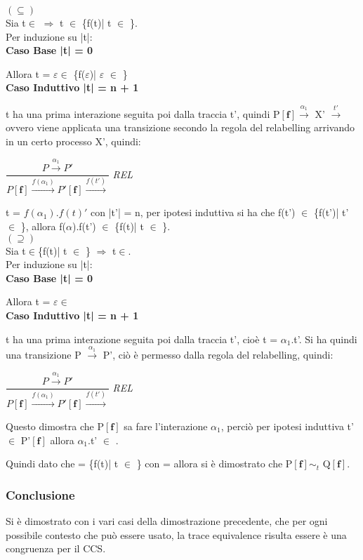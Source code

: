 $(\subseteq)$ \\

Sia t$\in$  $\Rightarrow$ t $\in$ \{f(t)| t $\in$ \}. \\
Per induzione su |t|:
\\

\textbf{Caso Base |t| = 0}

Allora t = $\varepsilon \in$ \{f($\varepsilon$)| $\varepsilon$ $\in$ \}\\


\textbf{Caso Induttivo |t| = n + 1}

t ha una prima interazione seguita poi dalla traccia t', quindi P$\mathbf{[f]}  \overset{\alpha_{1}}\rightarrow $ X' $\overset{t'}\rightarrow$ ovvero viene applicata una transizione secondo la regola del relabelling arrivando in un certo processo X', quindi:

$\dfrac{P \overset{\alpha_{1}}\rightarrow P'}{P \mathbf{[f]} \overset{f(\alpha_{1})}\rightarrow P'\mathbf{[f]}\overset{f(t')}\rightarrow}$ \textit{REL} 

t = $f(\alpha_{1}).f(t)'$ con |t'| = n, per ipotesi induttiva si ha che f(t') $\in$ \{f(t')| t' $\in$ \}, allora f($\alpha$).f(t') $\in$ \{f(t)| t $\in$ \}.\\

$(\supseteq)$ \\

Sia t$\in$\{f(t)| t $\in$ \}  $\Rightarrow$ t$\in$. \\
Per induzione su |t|:\\

\textbf{Caso Base |t| = 0}

Allora t = $\varepsilon \in$ \\

\textbf{Caso Induttivo |t| = n + 1}

t ha una prima interazione seguita poi dalla traccia t', cioè t = $\alpha_{1}$.t'. Si ha quindi una transizione P $\overset{\alpha_{1}}\rightarrow$ P', ciò è permesso dalla regola del relabelling, quindi:

$\dfrac{P \overset{\alpha_{1}}\rightarrow P'}{P \mathbf{[f]} \overset{f(\alpha_{1})}\rightarrow P'\mathbf{[f]}\overset{f(t')}\rightarrow}$ \textit{REL} 

Questo dimostra che P$\mathbf{[f]}$ sa fare l'interazione $\alpha_{1}$, perciò per ipotesi induttiva t'$\in$ P'$\mathbf{[f]}$ allora $\alpha_{1}$.t' $\in$ .

Quindi dato che  = \{f(t)| t $\in$ \} con  =  allora si è dimostrato che  P$\mathbf{[f]}\sim_{t}$ Q$\mathbf{[f]}$.\\

\subsubsection{Conclusione}
Si è dimostrato con i vari casi della dimostrazione precedente, che per ogni possibile contesto che può essere usato, la trace equivalence risulta essere è una congruenza per il CCS. 
\pagebreak